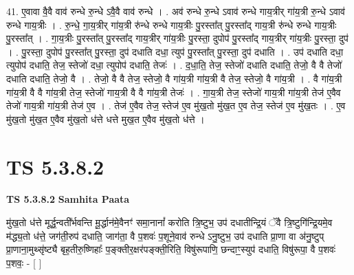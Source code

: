 \documentclass[17pt]{extarticle}
\begin{document}
41. ए॒वावा वै॒वै वाव॑ रुन्धे रु॒न्धे ऽवै॒वै वाव॑ रुन्धे । . अव॑ रुन्धे रु॒न्धे ऽवाव॑ रुन्धे गाय॒त्रीर् गा॑य॒त्री रु॒न्धे ऽवाव॑ रुन्धे गाय॒त्रीः । . रु॒न्धे॒ गा॒य॒त्रीर् गा॑य॒त्री रु॑न्धे रुन्धे गाय॒त्रीः पु॒रस्ता᳚त् पु॒रस्ता᳚द् गाय॒त्री रु॑न्धे रुन्धे गाय॒त्रीः पु॒रस्ता᳚त् । . गा॒य॒त्रीः पु॒रस्ता᳚त् पु॒रस्ता᳚द् गाय॒त्रीर् गा॑य॒त्रीः पु॒रस्ता॒ दुपोप॑ पु॒रस्ता᳚द् गाय॒त्रीर् गा॑य॒त्रीः पु॒रस्ता॒ दुप॑ । . पु॒रस्ता॒ दुपोप॑ पु॒रस्ता᳚त् पु॒रस्ता॒ दुप॑ दधाति दधा॒ त्युप॑ पु॒रस्ता᳚त् पु॒रस्ता॒ दुप॑ दधाति । . उप॑ दधाति दधा॒ त्युपोप॑ दधाति॒ तेज॒ स्तेजो॑ दधा॒ त्युपोप॑ दधाति॒ तेजः॑ । . द॒धा॒ति॒ तेज॒ स्तेजो॑ दधाति दधाति॒ तेजो॒ वै वै तेजो॑ दधाति दधाति॒ तेजो॒ वै । . तेजो॒ वै वै तेज॒ स्तेजो॒ वै गा॑य॒त्री गा॑य॒त्री वै तेज॒ स्तेजो॒ वै गा॑य॒त्री । . वै गा॑य॒त्री गा॑य॒त्री वै वै गा॑य॒त्री तेज॒ स्तेजो॑ गाय॒त्री वै वै गा॑य॒त्री तेजः॑ । . गा॒य॒त्री तेज॒ स्तेजो॑ गाय॒त्री गा॑य॒त्री तेज॑ ए॒वैव तेजो॑ गाय॒त्री गा॑य॒त्री तेज॑ ए॒व । . तेज॑ ए॒वैव तेज॒ स्तेज॑ ए॒व मु॑ख॒तो मु॑ख॒त ए॒व तेज॒ स्तेज॑ ए॒व मु॑ख॒तः । . ए॒व मु॑ख॒तो मु॑ख॒त ए॒वैव मु॑ख॒तो ध॑त्ते धत्ते मुख॒त ए॒वैव मु॑ख॒तो ध॑त्ते । \newline
\pagebreak
{}

\section{ TS 5.3.8.2 }

\textbf{TS 5.3.8.2 } \newline
\textbf{Samhita Paata} \newline

मु॑ख॒तो ध॑त्ते मूर्द्ध॒न्वती᳚र्भवन्ति मू॒र्द्धान॑मे॒वैनꣳ॑ समा॒नानां᳚ करोति त्रि॒ष्टुभ॒ उप॑ दधातीन्द्रि॒यं ॅवै त्रि॒ष्टुगि॑न्द्रि॒यमे॒व म॑द्ध्य॒तो ध॑त्ते॒ जग॑ती॒रुप॑ दधाति॒ जाग॑ता॒ वै प॒शवः॑ प॒शूने॒वाव॑ रुन्धे ऽनु॒ष्टुभ॒ उप॑ दधाति प्रा॒णा वा अ॑नु॒ष्टुप् प्रा॒णाना॒मुथ्सृ॑ष्ट्यै बृह॒तीरु॒ष्णिहाः᳚ प॒ङ्क्तीर॒क्षर॑पङ्क्ती॒रिति॒ विषु॑रूपाणि॒ छन्दाꣳ॒॒स्युप॑ दधाति॒ विषु॑रूपा॒ वै प॒शवः॑ प॒शवः॒ - [  ] \newline
\end{document}
